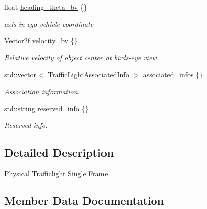 \begin{DoxyCompactItemize}
float \hyperlink{structmaf__perception__interface_1_1PhysicalTrafficLightSingleFrame_a27c84e7097fce41e0fd15080237e119e}{heading\+\_\+theta\+\_\+bv} \{\}
\begin{DoxyCompactList}\small\item\em axis in ego-\/vehicle coordinate \end{DoxyCompactList}\item 
\hyperlink{structmaf__perception__interface_1_1Vector2f}{Vector2f} \hyperlink{structmaf__perception__interface_1_1PhysicalTrafficLightSingleFrame_a97cb76a8cd716bcc1e229eef66718049}{velocity\+\_\+bv} \{\}
\begin{DoxyCompactList}\small\item\em Relative velocity of object center at bird\textquotesingle{}s-\/eye view. \end{DoxyCompactList}\item 
std\+::vector$<$ \hyperlink{structmaf__perception__interface_1_1TrafficLightAssociatedInfo}{Traffic\+Light\+Associated\+Info} $>$ \hyperlink{structmaf__perception__interface_1_1PhysicalTrafficLightSingleFrame_a5d58fc3e02c43aadcb1e8b1f8527bc91}{associated\+\_\+infos} \{\}
\begin{DoxyCompactList}\small\item\em Association information. \end{DoxyCompactList}\item 
std\+::string \hyperlink{structmaf__perception__interface_1_1PhysicalTrafficLightSingleFrame_a4c0a4c4d6513d87794fd4a9bd01a8e56}{reserved\+\_\+info} \{\}
\begin{DoxyCompactList}\small\item\em Reserved info. \end{DoxyCompactList}\end{DoxyCompactItemize}


\subsection{Detailed Description}
Physical Trafficlight Single Frame. 

\subsection{Member Data Documentation}
\mbox{\label{structmaf__perception__interface_1_1PhysicalTrafficLightSingleFrame_a5d58fc3e02c43aadcb1e8b1f8527bc91}} 
